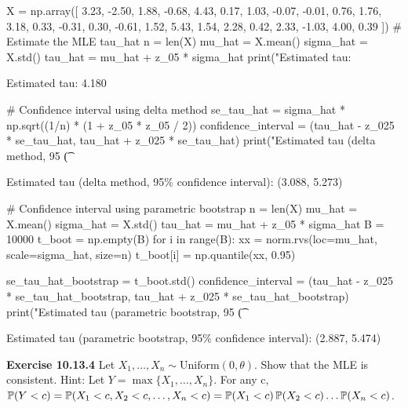 \begin{python}
X = np.array([
    3.23, -2.50,  1.88, -0.68,  4.43, 0.17,
    1.03, -0.07, -0.01,  0.76,  1.76, 3.18,
    0.33, -0.31,  0.30, -0.61,  1.52, 5.43,
    1.54,  2.28,  0.42,  2.33, -1.03, 4.00,
    0.39   
])
# Estimate the MLE tau_hat
n = len(X)
mu_hat = X.mean()
sigma_hat = X.std()
tau_hat = mu_hat + z_05 * sigma_hat
print("Estimated tau: %
\end{python}
\begin{console}
Estimated tau: 4.180
\end{console}

\begin{python}
# Confidence interval using delta method
se_tau_hat = sigma_hat * np.sqrt((1/n) * (1 + z_05 * z_05 / 2))
confidence_interval = (tau_hat - z_025 * se_tau_hat, 
                         tau_hat + z_025 * se_tau_hat)
print("Estimated tau (delta method, 95%
       \t (%
\end{python}
\begin{console}
Estimated tau (delta method, 95\% confidence interval):   (3.088, 5.273)
\end{console}

\begin{python}
# Confidence interval using parametric bootstrap
n = len(X)
mu_hat = X.mean()
sigma_hat = X.std()
tau_hat = mu_hat + z_05 * sigma_hat
B = 10000
t_boot = np.empty(B)
for i in range(B):
    xx = norm.rvs(loc=mu_hat, scale=sigma_hat, size=n)
    t_boot[i] = np.quantile(xx, 0.95)
    
se_tau_hat_bootstrap = t_boot.std()
confidence_interval = (tau_hat - z_025 * se_tau_hat_bootstrap, 
                         tau_hat + z_025 * se_tau_hat_bootstrap)
print("Estimated tau (parametric bootstrap, 95%
      \t (%
\end{python}
\begin{console}
Estimated tau (parametric bootstrap, 95\% confidence interval):
                                                 (2.887, 5.474)
\end{console}

\textbf{Exercise 10.13.4} Let
\(X_{1}, \dots, X_{n} \sim \text{Uniform}(0, \theta)\). Show that the MLE is
consistent.
Hint: Let \(Y = \max \{ X_{1}, \dots, X_{n} \}\). For any c,
\(\operatorname{\mathbb{P}}(Y < c) = \operatorname{\mathbb{P}}(X_{1} < c, X_{2} < c, \dots, X_{n} < c) = \operatorname{\mathbb{P}}(X_{1} < c)\operatorname{\mathbb{P}}(X_{2} < c)\dots\operatorname{\mathbb{P}}(X_{n} < c)\).

